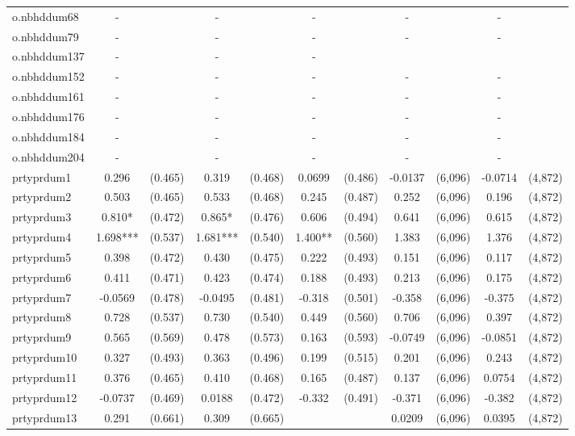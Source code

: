 \documentclass[]{article}
\begin{document}
\begin{tabular}{lcccccccccc}
o.nbhddum68 & - &  & - &  & - &  & - &  & - &  \\
o.nbhddum79 & - &  & - &  & - &  & - &  & - &  \\
o.nbhddum137 & - &  & - &  & - &  &  &  &  &  \\
o.nbhddum152 & - &  & - &  & - &  & - &  & - &  \\
o.nbhddum161 & - &  & - &  & - &  & - &  & - &  \\
o.nbhddum176 & - &  & - &  & - &  & - &  & - &  \\
o.nbhddum184 & - &  & - &  & - &  & - &  & - &  \\
o.nbhddum204 & - &  & - &  & - &  & - &  & - &  \\
prtyprdum1 & 0.296 & (0.465) & 0.319 & (0.468) & 0.0699 & (0.486) & -0.0137 & (6,096) & -0.0714 & (4,872) \\
prtyprdum2 & 0.503 & (0.465) & 0.533 & (0.468) & 0.245 & (0.487) & 0.252 & (6,096) & 0.196 & (4,872) \\
prtyprdum3 & 0.810* & (0.472) & 0.865* & (0.476) & 0.606 & (0.494) & 0.641 & (6,096) & 0.615 & (4,872) \\
prtyprdum4 & 1.698*** & (0.537) & 1.681*** & (0.540) & 1.400** & (0.560) & 1.383 & (6,096) & 1.376 & (4,872) \\
prtyprdum5 & 0.398 & (0.472) & 0.430 & (0.475) & 0.222 & (0.493) & 0.151 & (6,096) & 0.117 & (4,872) \\
prtyprdum6 & 0.411 & (0.471) & 0.423 & (0.474) & 0.188 & (0.493) & 0.213 & (6,096) & 0.175 & (4,872) \\
prtyprdum7 & -0.0569 & (0.478) & -0.0495 & (0.481) & -0.318 & (0.501) & -0.358 & (6,096) & -0.375 & (4,872) \\
prtyprdum8 & 0.728 & (0.537) & 0.730 & (0.540) & 0.449 & (0.560) & 0.706 & (6,096) & 0.397 & (4,872) \\
prtyprdum9 & 0.565 & (0.569) & 0.478 & (0.573) & 0.163 & (0.593) & -0.0749 & (6,096) & -0.0851 & (4,872) \\
prtyprdum10 & 0.327 & (0.493) & 0.363 & (0.496) & 0.199 & (0.515) & 0.201 & (6,096) & 0.243 & (4,872) \\
prtyprdum11 & 0.376 & (0.465) & 0.410 & (0.468) & 0.165 & (0.487) & 0.137 & (6,096) & 0.0754 & (4,872) \\
prtyprdum12 & -0.0737 & (0.469) & 0.0188 & (0.472) & -0.332 & (0.491) & -0.371 & (6,096) & -0.382 & (4,872) \\
prtyprdum13 & 0.291 & (0.661) & 0.309 & (0.665) &  &  & 0.0209 & (6,096) & 0.0395 & (4,872) \\

\end{tabular}
\end{document}
